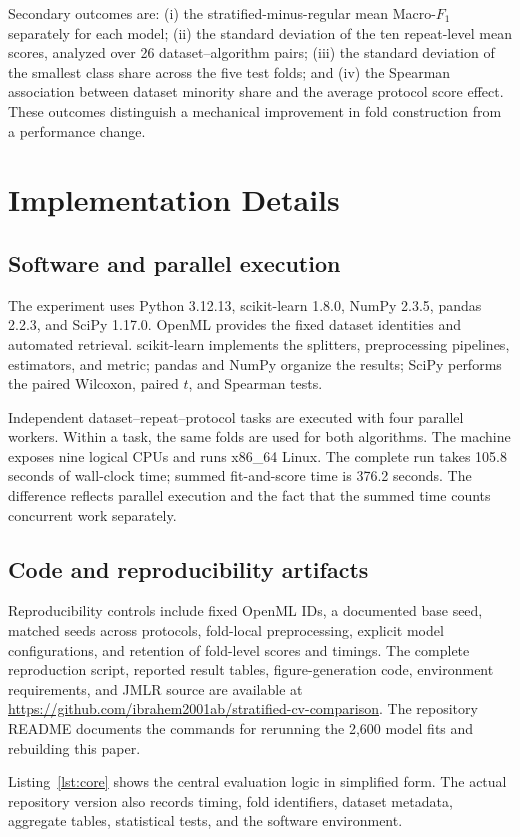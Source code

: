 \documentclass[twoside,11pt]{article}
\newcommand{\macrof}{Macro-$F_1$}
\begin{document}
Secondary outcomes are: (i) the stratified-minus-regular mean \macrof separately for each model; (ii) the standard deviation of the ten repeat-level mean scores, analyzed over 26 dataset--algorithm pairs; (iii) the standard deviation of the smallest class share across the five test folds; and (iv) the Spearman association between dataset minority share and the average protocol score effect. These outcomes distinguish a mechanical improvement in fold construction from a performance change.

\section{Implementation Details}
\subsection{Software and parallel execution}
The experiment uses Python 3.12.13, scikit-learn 1.8.0, NumPy 2.3.5, pandas 2.2.3, and SciPy 1.17.0. OpenML provides the fixed dataset identities and automated retrieval. scikit-learn implements the splitters, preprocessing pipelines, estimators, and metric; pandas and NumPy organize the results; SciPy performs the paired Wilcoxon, paired $t$, and Spearman tests.

Independent dataset--repeat--protocol tasks are executed with four parallel workers. Within a task, the same folds are used for both algorithms. The machine exposes nine logical CPUs and runs x86\_64 Linux. The complete run takes 105.8 seconds of wall-clock time; summed fit-and-score time is 376.2 seconds. The difference reflects parallel execution and the fact that the summed time counts concurrent work separately.

\subsection{Code and reproducibility artifacts}
Reproducibility controls include fixed OpenML IDs, a documented base seed, matched seeds across protocols, fold-local preprocessing, explicit model configurations, and retention of fold-level scores and timings. The complete reproduction script, reported result tables, figure-generation code, environment requirements, and JMLR source are available at \url{https://github.com/ibrahem2001ab/stratified-cv-comparison}. The repository README documents the commands for rerunning the 2,600 model fits and rebuilding this paper.

Listing~\ref{lst:core} shows the central evaluation logic in simplified form. The actual repository version also records timing, fold identifiers, dataset metadata, aggregate tables, statistical tests, and the software environment.
\end{document}
